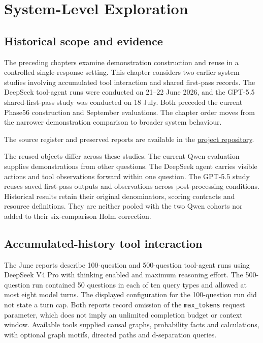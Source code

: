 \chapter{System-Level Exploration}
\label{chap:system-exploration}\label{ch:6}

\section{Historical scope and evidence}\label{sec:6.1}

The preceding chapters examine demonstration construction and reuse in a controlled single-response setting. This chapter considers two earlier system studies involving accumulated tool interaction and shared first-pass records. The DeepSeek tool-agent runs were conducted on 21--22 June 2026, and the GPT-5.5 shared-first-pass study was conducted on 18 July. Both preceded the current Phase56 construction and September evaluations. The chapter order moves from the narrower demonstration comparison to broader system behaviour.

The source register and preserved reports are available in the \href{https://github.com/aklovey/EMATM0047_2025_AYEAR_2746456}{project repository}.

The reused objects differ across these studies. The current Qwen evaluation supplies demonstrations from other questions. The DeepSeek agent carries visible actions and tool observations forward within one question. The GPT-5.5 study reuses saved first-pass outputs and observations across post-processing conditions. Historical results retain their original denominators, scoring contracts and resource definitions. They are neither pooled with the two Qwen cohorts nor added to their six-comparison Holm correction.

\section{Accumulated-history tool interaction}\label{sec:6.2}

The June reports describe 100-question and 500-question tool-agent runs using DeepSeek V4 Pro with thinking enabled and maximum reasoning effort. The 500-question run contained 50 questions in each of ten query types and allowed at most eight model turns. The displayed configuration for the 100-question run did not state a turn cap. Both reports record omission of the \texttt{max\_tokens} request parameter, which does not imply an unlimited completion budget or context window. Available tools supplied causal graphs, probability facts and calculations, with optional graph motifs, directed paths and d-separation queries.

